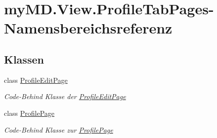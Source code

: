 \hypertarget{namespacemy_m_d_1_1_view_1_1_profile_tab_pages}{}\section{my\+M\+D.\+View.\+Profile\+Tab\+Pages-\/\+Namensbereichsreferenz}
\label{namespacemy_m_d_1_1_view_1_1_profile_tab_pages}
\subsection*{Klassen}
\begin{DoxyCompactItemize}
\item 
class \mbox{\hyperlink{classmy_m_d_1_1_view_1_1_profile_tab_pages_1_1_profile_edit_page}{Profile\+Edit\+Page}}
\begin{DoxyCompactList}\small\item\em Code-\/\+Behind Klasse der \mbox{\hyperlink{classmy_m_d_1_1_view_1_1_profile_tab_pages_1_1_profile_edit_page}{Profile\+Edit\+Page}} \end{DoxyCompactList}\item 
class \mbox{\hyperlink{classmy_m_d_1_1_view_1_1_profile_tab_pages_1_1_profile_page}{Profile\+Page}}
\begin{DoxyCompactList}\small\item\em Code-\/\+Behind Klasse zur \mbox{\hyperlink{classmy_m_d_1_1_view_1_1_profile_tab_pages_1_1_profile_page}{Profile\+Page}} \end{DoxyCompactList}\end{DoxyCompactItemize}
